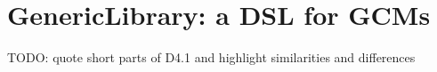 \documentclass[]{article}
\begin{document}
\section{GenericLibrary: a DSL for GCMs}

TODO: quote short parts of D4.1 and highlight similarities and differences

%
%
%
%
%
\end{document}
